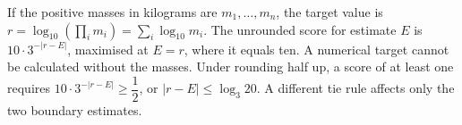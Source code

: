If the positive masses in kilograms are $m_1,\ldots,m_n$, the target value is $r=\log_{10}(\prod_i m_i)=\sum_i\log_{10}m_i$. The unrounded score for estimate $E$ is $10\cdot3^{-|r-E|}$, maximised at $E=r$, where it equals ten. A numerical target cannot be calculated without the masses. Under rounding half up, a score of at least one requires $10\cdot3^{-|r-E|}\ge\dfrac{1}{2}$, or $|r-E|\le\log_3 20$. A different tie rule affects only the two boundary estimates.
